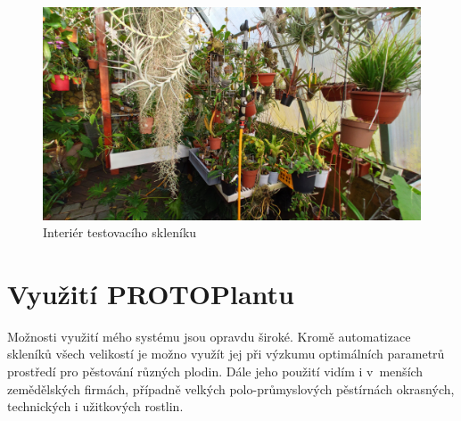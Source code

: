 \begin{figure}[htbp]
    \centering
    \includegraphics[width=\textwidth]{img/PHOTOS/OrchidHouse_INTERIOR.jpg}
    \caption{Interiér testovacího skleníku}
    \label{fig:OrchidHouse_INTERIORs}
\end{figure}

\section{Využití PROTOPlantu}
Možnosti využití mého systému jsou opravdu široké.
Kromě automatizace skleníků všech velikostí je možno využít jej při výzkumu optimálních parametrů prostředí pro pěstování různých plodin.
Dále jeho použití vidím i v~menších zemědělských firmách, případně velkých polo-průmyslových pěstírnách okrasných, technických i užitkových rostlin. 

\newpage